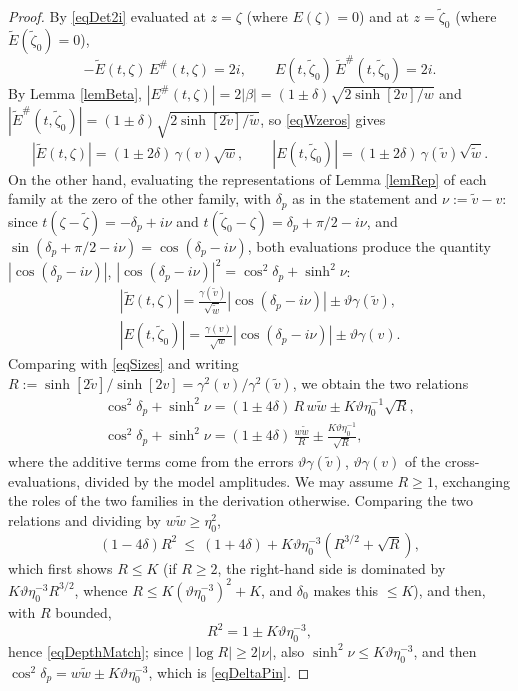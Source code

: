 \documentclass[11pt,twoside,reqno]{amsart}
\def\ti{\tilde}
\def\d{\delta}
\def\g{\gamma}
\def\b{\beta}
\theoremstyle{plain}
\numberwithin{equation}{section}
\begin{document}
\begin{proof}
By \eqref{eqDet2i} evaluated at $z=\zeta$ (where $E(\zeta)=0$) and at $z=\ti\zeta_0$ (where $\ti E(\ti\zeta_0)=0$),
\begin{equation}
-\ti E(t,\zeta)\,E^\#(t,\zeta)=2i,\qquad E(t,\ti\zeta_0)\,\ti E^\#(t,\ti\zeta_0)=2i .
\label{eqWzeros}
\end{equation}
By Lemma \ref{lemBeta}, $|E^\#(t,\zeta)|=2|\b|=(1\pm\d)\sqrt{2\sinh[2v]/w}$ and $|\ti E^\#(t,\ti\zeta_0)|=(1\pm\d)\sqrt{2\sinh[2\ti v]/\ti w}$, so \eqref{eqWzeros} gives
\begin{equation}
|\ti E(t,\zeta)|=(1\pm2\d)\,\g(v)\sqrt{w},\qquad
|E(t,\ti\zeta_0)|=(1\pm2\d)\,\g(\ti v)\sqrt{\ti w}.
\label{eqSizes}
\end{equation}
On the other hand, evaluating the representations of Lemma \ref{lemRep} of each family at the zero of the other family, with $\d_p$ as in the statement and $\nu:=\ti v-v$: since
$t(\zeta-\ti\zeta)=-\d_p+i\nu$ and $t(\ti\zeta_0-\zeta)=\d_p+\pi/2-i\nu$, and $\sin(\d_p+\pi/2-i\nu)=\cos(\d_p-i\nu)$, both evaluations produce the quantity $|\cos(\d_p-i\nu)|$, $|\cos(\d_p-i\nu)|^2=\cos^2\d_p+\sinh^2\nu$:
$$\begin{gathered}|\ti E(t,\zeta)|=\frac{\g(\ti v)}{\sqrt{\ti w}}\left|\cos(\d_p-i\nu)\right|\pm\vartheta\g(\ti v),\\
|E(t,\ti\zeta_0)|=\frac{\g(v)}{\sqrt{w}}\left|\cos(\d_p-i\nu)\right|\pm\vartheta\g(v).\end{gathered}$$
Comparing with \eqref{eqSizes} and writing $R:=\sinh[2\ti v]/\sinh[2v]=\g^2(v)/\g^2(\ti v)$, we obtain the two relations
$$\begin{gathered}\cos^2\d_p+\sinh^2\nu=(1\pm4\d)\,R\,w\ti w\pm K\vartheta\eta_0^{-1}\sqrt R,\\
\cos^2\d_p+\sinh^2\nu=(1\pm4\d)\,\frac{w\ti w}{R}\pm \frac{K\vartheta\eta_0^{-1}}{\sqrt R},\end{gathered}$$
where the additive terms come from the errors $\vartheta\g(\ti v)$, $\vartheta\g(v)$ of the cross-evaluations, divided by the model amplitudes. We may assume $R\geq1$, exchanging the roles of the two families in the derivation otherwise. Comparing the two relations and dividing by $w\ti w\geq\eta_0^2$,
$$(1-4\d)R^2\ \leq\ (1+4\d)+K\vartheta\eta_0^{-3}\left(R^{3/2}+\sqrt R\right),$$
which first shows $R\leq K$ (if $R\geq2$, the right-hand side is dominated by $K\vartheta\eta_0^{-3}R^{3/2}$, whence $R\leq K(\vartheta\eta_0^{-3})^2+K$, and $\d_0$ makes this $\leq K$), and then, with $R$ bounded,
$$R^2=1\pm K\vartheta\eta_0^{-3},$$
hence \eqref{eqDepthMatch}; since $|\log R|\geq2|\nu|$, also $\sinh^2\nu\leq K\vartheta\eta_0^{-3}$, and then $\cos^2\d_p=w\ti w\pm K\vartheta\eta_0^{-3}$, which is \eqref{eqDeltaPin}.


\end{proof}
\end{document}
